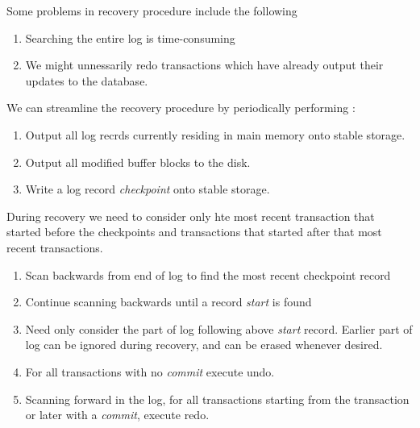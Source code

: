 \documentclass{article}
\begin{document}
Some problems in recovery procedure include the following 
\begin{enumerate}
  \item Searching the entire log is time-consuming 
  \item We might unnessarily redo transactions which have already output their updates to the database. 
\end{enumerate}
We can streamline the recovery procedure by periodically performing : 
\begin{enumerate}
  \item Output all log recrds currently residing in main memory onto stable storage. 
  \item Output all modified buffer blocks to the disk. 
  \item Write a log record \emph{checkpoint} onto stable storage. 
\end{enumerate}
During recovery we need to consider only hte most recent transaction that started before the checkpoints and transactions that started after that most recent transactions. 
\begin{enumerate}
  \item Scan backwards from end of log to find the most recent checkpoint record\item Continue scanning backwards until a record \emph{start} is found 
  \item Need only consider the part of log following above \emph{start} record. Earlier part of log can be ignored during recovery, and can be erased whenever desired. 
  \item For all transactions with no \emph{commit} execute undo. 
  \item Scanning forward in the log, for all transactions starting from the transaction or later with a \emph{commit}, execute redo. 
\end{enumerate}
\end{document}
